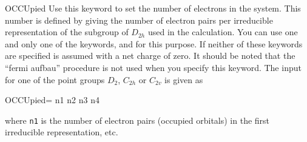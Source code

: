 \begin{keywordlist}
\item[OCCUpied]
Use this keyword to set the number of electrons in the system.
This number is defined by giving the number of electron pairs
per irreducible representation of the subgroup of $D_{2h}$ used
in the calculation.
You can use one and only one of the keywords,
 and
 for this purpose.
If neither of these keywords are specified
 is assumed with a net charge of zero.
It should be noted that the ``fermi aufbau''
procedure is not used when you specify this keyword.
The input for one of the point groups $D_2$, $C_{2h}$ or $C_{2v}$
is given as
\begin{inputlisting}
OCCUpied= n1 n2 n3 n4
\end{inputlisting}
where \verb+n1+ is the number of electron pairs (occupied orbitals)
in the first irreducible representation, etc.


\end{keywordlist}
